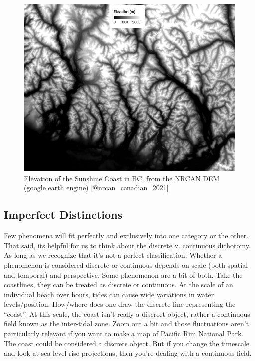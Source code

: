 \documentclass[
]{book}
\begin{document}
\begin{figure}
\includegraphics[width=0.75\linewidth]{images/03-elevation} \caption{Elevation of the Sunshine Coast in BC, from the NRCAN DEM (google earth engine) [@nrcan_canadian_2021]}\label{fig:3-elevation}
\end{figure}

\hypertarget{imperfect-distinctions}{%
\subsection{Imperfect Distinctions}\label{imperfect-distinctions}}

Few phenomena will fit perfectly and exclusively into one category or the other. That said, its helpful for us to think about the discrete v. continuous dichotomy. As long as we recognize that it's not a perfect classification. Whether a phenomenon is considered discrete or continuous depends on scale (both spatial and temporal) and perspective. Some phenomenon are a bit of both. Take the coastlines, they can be treated as discrete or continuous. At the scale of an individual beach over hours, tides can cause wide variations in water levels/position. How/where does one draw the discrete line representing the ``coast''. At this scale, the coast isn't really a discreet object, rather a continuous field known as the inter-tidal zone. Zoom out a bit and those fluctuations aren't particularly relevant if you want to make a map of Pacific Rim National Park. The coast could be considered a discrete object. But if you change the timescale and look at sea level rise projections, then you're dealing with a continuous field.
\end{document}
